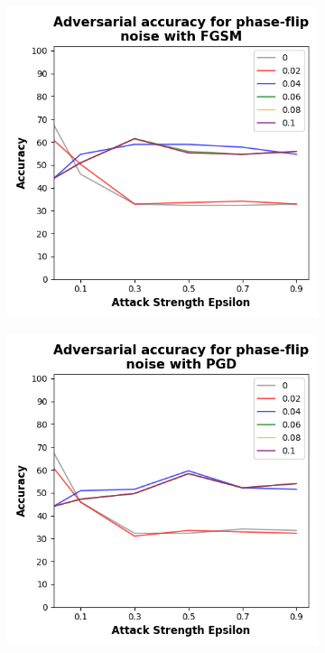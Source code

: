 \begin{figure}[!h]
  \centering

  \begin{subfigure}{0.45\textwidth}
      \includegraphics[width=\linewidth]{figures/evaluation_results/diabetes/pqc/figures/phase-flip-fgsm.png}
      \label{fig:diabetes15}
  \end{subfigure} \qquad
  \begin{subfigure}{0.45\textwidth}
      \includegraphics[width=\linewidth]{figures/evaluation_results/diabetes/pqc/figures/phase-flip-pgd.png}
      \label{fig:diabetes16}
  \end{subfigure}


\end{figure}
